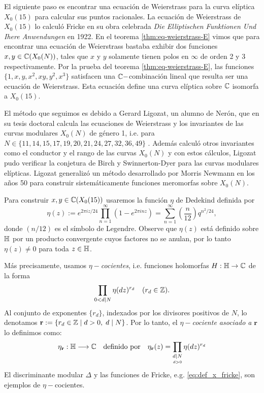 El siguiente paso es encontrar una ecuación de Weierstrass para la curva elíptica $X_0(15)$ para calcular sus puntos racionales. La ecuación de Weierstrass de $X_0(15)$ lo calculó Fricke en su obra celebrada \emph{Die Elliptischen Funktionen Und Ihere Anwendungen} en 1922. En el teorema \ref{thm:eq-weierstrass-E} vimos que para encontrar una ecuación de Weierstrass bastaba exhibir dos funciones $x,y\in\mathbb{C}(X_0(N))$, tales que $x$ y $y$ solamente tienen polos en $\infty$ de orden 2 y 3 respectivamente. Por la prueba del teorema \ref{thm:eq-weierstrass-E}, las funciones $\{1,x,y,x^2,xy,y^2,x^3\}$ satisfacen una $\mathbb{C}-$combinación lineal que resulta ser una ecuación de Weierstrass. Esta ecuación define una curva elíptica sobre $\mathbb{C}$ isomorfa a $X_0(15)$.

El método que seguimos es debido a Gerard Ligozat, un alumno de Nerón, que en su tesis doctoral calcula las ecuaciones de Weierstrass y los invariantes de las curvas modulares $X_0(N)$ de género 1, i.e. para $N\in\{11,14,15,17,19,20,21,24,27,32,36,49\}$ \cite{LigozatCMDG1}. Además calculó otros invariantes como el conductor y el rango de las curvas $X_0(N)$ y con estos cálculos, Ligozat pudo verificar la conjetura de Birch y Swinnerton-Dyer para las curvas modulares elípticas. Ligozat generalizó un método desarrollado por Morris Newmann en los a\~nos 50 para construir sistemáticamente funciones meromorfas sobre $X_0(N)$.

Para construir $x,y\in \mathbb{C}(X_0(15))$ usaremos la función $\eta$ de Dedekind definida por
\begin{equation}\label{defin:eta}
	\eta(z):=e^{2\pi iz/24}\prod_{n=1}^\infty(1-e^{2\pi inz})=\sum_{n=1}^{\infty} \left(\frac{n}{12}\right)q^{n^2/24},
\end{equation}
donde $(n/12)$ es el símbolo de Legendre. Observe que $\eta(z)$ está definido sobre $\mathbb{H}$ por un producto convergente cuyos factores no se anulan, por lo tanto $\eta(z)\neq0$ para toda $z\in\mathbb{H}$.

Más precisamente, usamos $\eta-$\emph{cocientes}, i.e. funciones holomorfas $H:\mathbb{H}\rightarrow\mathbb{C}$ de la forma
\[
	\prod_{0<d\mid N}\eta(dz)^{r_d} \quad (r_d\in\mathbb{Z}).
\]
Al conjunto de exponentes $\{r_d\}$, indexados por los divisores positivos de $N$, lo denotamos $\mathbf{r}:=\{r_d\in\mathbb{Z}\mid d>0,\; d\mid N\}$. Por lo tanto, el $\eta-$\emph{cociente asociado a} $\mathbf{r}$ lo definimos como:
\[
	\eta_{\mathbf{r}}:\mathbb{H}\longrightarrow\mathbb{C}\quad\text{definido por}\quad
	\eta_{\mathbf{r}}(z)=\prod_{\underset{d>0}{d\mid N}}\eta(dz)^{r_d}
\]
El discriminante modular $\Delta$ y las funciones de Fricke, e.g.  \eqref{eq:def_x_fricke}, son ejemplos de $\eta-$cocientes.

